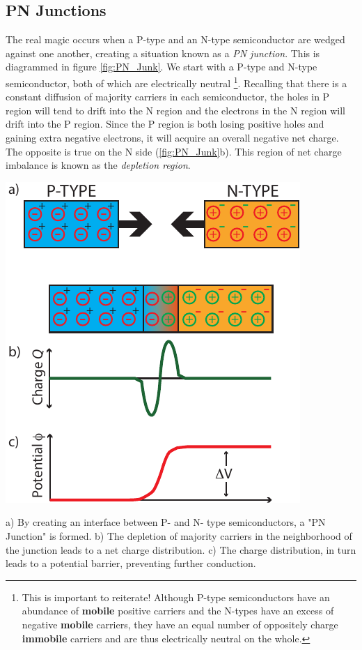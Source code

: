 \documentclass{tufte-book}
\begin{document}
\subsection{PN Junctions}
The real magic occurs when a P-type and an N-type semiconductor are wedged against one another, creating a situation known as a \textit{PN junction}. This is diagrammed in figure \ref{fig:PN_Junk}. We start with a P-type and N-type semiconductor, both of which are electrically neutral \footnote{This is important to reiterate! Although P-type semiconductors have an abundance of \textbf{mobile} positive carriers and the N-types have an excess of negative \textbf{mobile} carriers, they have an equal number of oppositely charge \textbf{immobile} carriers and are thus electrically neutral on the whole.}. Recalling that there is a constant diffusion of majority carriers in each semiconductor, the holes in P region will tend to drift into the N region and the electrons in the N region will drift into the P region. Since the P region is both losing positive holes and gaining extra negative electrons, it will acquire an overall negative net charge. The opposite is true on the N side (\ref{fig:PN_Junk}b). This region of net charge imbalance is known as the \textit{depletion region}.

\begin{marginfigure}%
  \includegraphics[]{PN_Junction}
  \caption{a) By creating an interface between P- and N- type semiconductors, a "PN Junction" is formed. b) The depletion of majority carriers in the neighborhood of the junction leads to a net charge distribution. c) The charge distribution, in turn leads to a potential barrier, preventing further conduction.}
  \label{fig:PN_Junk}
\end{marginfigure}
\end{document}

